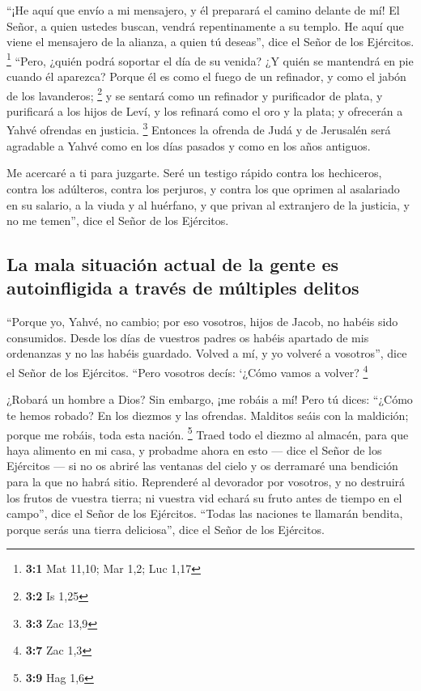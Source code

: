 \begin{paracol}{2}
 ``¡He aquí que envío a mi mensajero, y él preparará el
camino delante de mí! El Señor, a quien ustedes buscan, vendrá
repentinamente a su templo. He aquí que viene el mensajero de la
alianza, a quien tú deseas'', dice el Señor de los Ejércitos.
\footnote{\textbf{3:1} Mat 11,10; Mar 1,2; Luc 1,17} 
``Pero, ¿quién podrá soportar el día de su venida? ¿Y quién se mantendrá
en pie cuando él aparezca? Porque él es como el fuego de un refinador, y
como el jabón de los lavanderos; \footnote{\textbf{3:2} Is 1,25}
 y se sentará como un refinador y purificador de plata, y
purificará a los hijos de Leví, y los refinará como el oro y la plata; y
ofrecerán a Yahvé ofrendas en justicia. \footnote{\textbf{3:3} Zac 13,9}
 Entonces la ofrenda de Judá y de Jerusalén será agradable
a Yahvé como en los días pasados y como en los años antiguos.

 Me acercaré a ti para juzgarte. Seré un testigo rápido
contra los hechiceros, contra los adúlteros, contra los perjuros, y
contra los que oprimen al asalariado en su salario, a la viuda y al
huérfano, y que privan al extranjero de la justicia, y no me temen'',
dice el Señor de los Ejércitos.

\hypertarget{la-mala-situaciuxf3n-actual-de-la-gente-es-autoinfligida-a-travuxe9s-de-muxfaltiples-delitos}{%
\subsection{La mala situación actual de la gente es autoinfligida a
través de múltiples
delitos}\label{la-mala-situaciuxf3n-actual-de-la-gente-es-autoinfligida-a-travuxe9s-de-muxfaltiples-delitos}}

 ``Porque yo, Yahvé, no cambio; por eso vosotros, hijos de
Jacob, no habéis sido consumidos.  Desde los días de
vuestros padres os habéis apartado de mis ordenanzas y no las habéis
guardado. Volved a mí, y yo volveré a vosotros'', dice el Señor de los
Ejércitos. ``Pero vosotros decís: `¿Cómo vamos a volver? \footnote{\textbf{3:7}
  Zac 1,3}

 ¿Robará un hombre a Dios? Sin embargo, ¡me robáis a mí!
Pero tú dices: ``¿Cómo te hemos robado? En los diezmos y las ofrendas.
 Malditos seáis con la maldición; porque me robáis, toda
esta nación. \footnote{\textbf{3:9} Hag 1,6}  Traed todo
el diezmo al almacén, para que haya alimento en mi casa, y probadme
ahora en esto --- dice el Señor de los Ejércitos --- si no os abriré las
ventanas del cielo y os derramaré una bendición para la que no habrá
sitio.  Reprenderé al devorador por vosotros, y no
destruirá los frutos de vuestra tierra; ni vuestra vid echará su fruto
antes de tiempo en el campo'', dice el Señor de los Ejércitos.
 ``Todas las naciones te llamarán bendita, porque serás
una tierra deliciosa'', dice el Señor de los Ejércitos.


\end{paracol}
